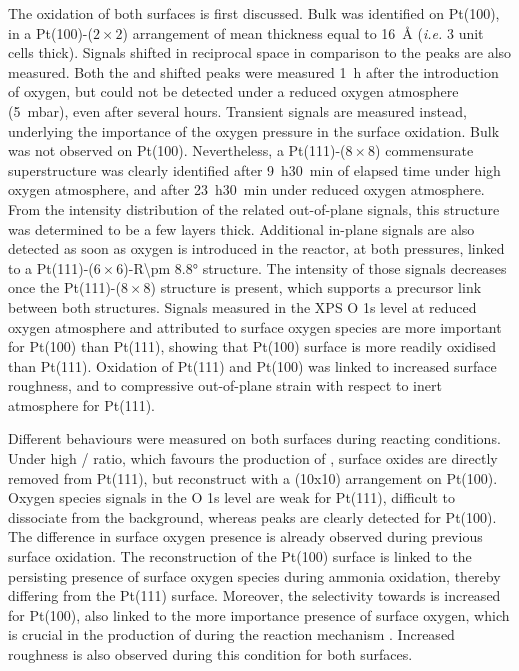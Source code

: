 The oxidation of both surfaces is first discussed.
Bulk  was identified on Pt(100), in a Pt(100)-($2\times2$) arrangement of mean thickness equal to \qty{16}{\angstrom} (\textit{i.e.} 3 unit cells thick).
Signals shifted in reciprocal space in comparison to the  peaks are also measured.
Both the  and shifted peaks were measured \qty{1}{\hour} after the introduction of oxygen, but could not be detected under a reduced oxygen atmosphere (\qty{5}{\milli\bar}), even after several hours.
Transient signals are measured instead, underlying the importance of the oxygen pressure in the surface oxidation.
Bulk  was not observed on Pt(100).
Nevertheless, a Pt(111)-($8\times8$) commensurate superstructure was clearly identified after \qty{9}{\hour}\qty{30}{\minute} of elapsed time under high oxygen atmosphere, and after \qty{23}{\hour}\qty{30}{\minute} under reduced oxygen atmosphere.
From the intensity distribution of the related out-of-plane signals, this structure was determined to be a few layers thick.
Additional in-plane signals are also detected as soon as oxygen is introduced in the reactor, at both pressures, linked to a Pt(111)-($6\times6$)-R\ang{\pm 8.8} structure.
The intensity of those signals decreases once the Pt(111)-($8\times8$) structure is present, which supports a precursor link between both structures.
Signals measured in the XPS O 1s level at reduced oxygen atmosphere and attributed to surface oxygen species are more important for Pt(100) than Pt(111), showing that Pt(100) surface is more readily oxidised than Pt(111).
Oxidation of Pt(111) and Pt(100) was linked to increased surface roughness, and to compressive out-of-plane strain with respect to inert atmosphere for Pt(111).

Different behaviours were measured on both surfaces during reacting conditions.
Under high / ratio, which favours the production of , surface oxides are directly removed from Pt(111), but reconstruct with a (10x10) arrangement on Pt(100).
Oxygen species signals in the O 1s level are weak for Pt(111), difficult to dissociate from the background, whereas peaks are clearly detected for Pt(100).
The difference in surface oxygen presence is already observed during previous surface oxidation.
The reconstruction of the Pt(100) surface is linked to the persisting presence of surface oxygen species during ammonia oxidation, thereby differing from the Pt(111) surface.
Moreover, the selectivity towards  is increased for Pt(100), also linked to the more importance presence of surface oxygen, which is crucial in the production of  during the reaction mechanism \parencite{NovellLeruth2005, Offermans2006, Offermans2007, Imbihl2007, NovellLeruth2008}.
Increased roughness is also observed during this condition for both surfaces.

